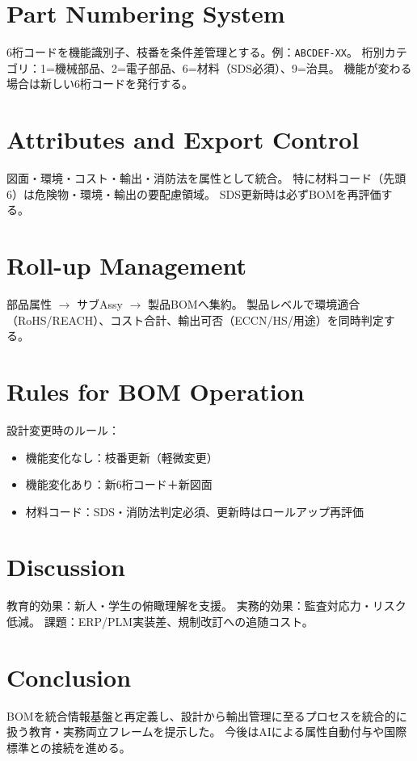 \documentclass[10pt,conference]{IEEEtran}
\begin{document}
\section{Part Numbering System}
6桁コードを機能識別子、枝番を条件差管理とする。例：\texttt{ABCDEF-XX}。  
桁別カテゴリ：1=機械部品、2=電子部品、6=材料（SDS必須）、9=治具。  
機能が変わる場合は新しい6桁コードを発行する。

\section{Attributes and Export Control}
図面・環境・コスト・輸出・消防法を属性として統合。  
特に材料コード（先頭6）は危険物・環境・輸出の要配慮領域。  
SDS更新時は必ずBOMを再評価する。

\section{Roll-up Management}
部品属性 $\rightarrow$ サブAssy $\rightarrow$ 製品BOMへ集約。  
製品レベルで環境適合（RoHS/REACH）、コスト合計、輸出可否（ECCN/HS/用途）を同時判定する。

\section{Rules for BOM Operation}
設計変更時のルール：
\begin{itemize}
  \item 機能変化なし：枝番更新（軽微変更）
  \item 機能変化あり：新6桁コード＋新図面
  \item 材料コード：SDS・消防法判定必須、更新時はロールアップ再評価
\end{itemize}

\section{Discussion}
教育的効果：新人・学生の俯瞰理解を支援。  
実務的効果：監査対応力・リスク低減。  
課題：ERP/PLM実装差、規制改訂への追随コスト。

\section{Conclusion}
BOMを統合情報基盤と再定義し、設計から輸出管理に至るプロセスを統合的に扱う教育・実務両立フレームを提示した。  
今後はAIによる属性自動付与や国際標準との接続を進める。
\end{document}
